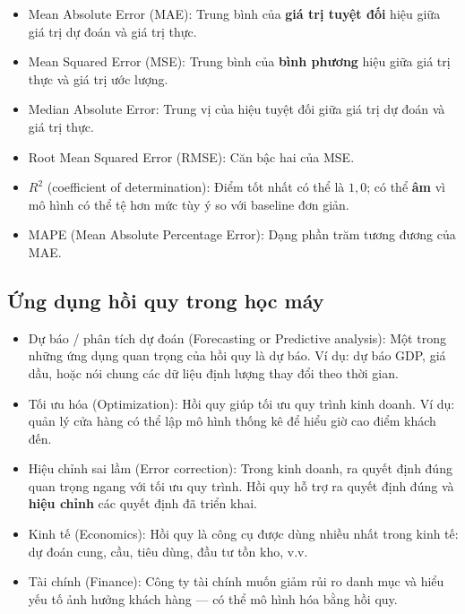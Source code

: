 \begin{tinhchat}[title={Metric đánh giá hồi quy}]
\begin{itemize}
  \item Mean Absolute Error (MAE): Trung bình của \textbf{giá trị tuyệt đối} hiệu giữa giá trị dự đoán và giá trị thực.
  \item Mean Squared Error (MSE): Trung bình của \textbf{bình phương} hiệu giữa giá trị thực và giá trị ước lượng.
  \item Median Absolute Error: Trung vị của hiệu tuyệt đối giữa giá trị dự đoán và giá trị thực.
  \item Root Mean Squared Error (RMSE): Căn bậc hai của MSE.
  \item $R^2$ (coefficient of determination): Điểm tốt nhất có thể là $1{,}0$; có thể \textbf{âm} vì mô hình có thể tệ hơn mức tùy ý so với baseline đơn giản.
  \item MAPE (Mean Absolute Percentage Error): Dạng phần trăm tương đương của MAE.
\end{itemize}
\end{tinhchat}

\subsection{Ứng dụng hồi quy trong học máy}

\begin{ynghia}[title={Ứng dụng hồi quy trong học máy}]
\begin{itemize}
  \item Dự báo / phân tích dự đoán (Forecasting or Predictive analysis): Một trong những ứng dụng quan trọng của hồi quy là dự báo. Ví dụ: dự báo GDP, giá dầu, hoặc nói chung các dữ liệu định lượng thay đổi theo thời gian.
  \item Tối ưu hóa (Optimization): Hồi quy giúp tối ưu quy trình kinh doanh. Ví dụ: quản lý cửa hàng có thể lập mô hình thống kê để hiểu giờ cao điểm khách đến.
  \item Hiệu chỉnh sai lầm (Error correction): Trong kinh doanh, ra quyết định đúng quan trọng ngang với tối ưu quy trình. Hồi quy hỗ trợ ra quyết định đúng và \textbf{hiệu chỉnh} các quyết định đã triển khai.
  \item Kinh tế (Economics): Hồi quy là công cụ được dùng nhiều nhất trong kinh tế: dự đoán cung, cầu, tiêu dùng, đầu tư tồn kho, v.v.
  \item Tài chính (Finance): Công ty tài chính muốn giảm rủi ro danh mục và hiểu yếu tố ảnh hưởng khách hàng --- có thể mô hình hóa bằng hồi quy.
\end{itemize}
\end{ynghia}

